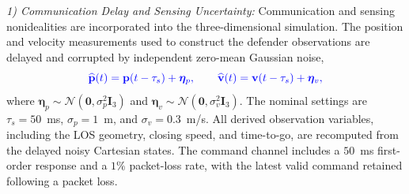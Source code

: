 \documentclass[lettersize,journal]{IEEEtran}
\newcommand{\hladd}[1]{{\color{blue}#1}}
\begin{document}



\hladd{\emph{1) Communication Delay and Sensing Uncertainty:}
Communication and sensing nonidealities are incorporated into the
three-dimensional simulation. The position and velocity measurements used to
construct the defender observations are delayed and corrupted by independent
zero-mean Gaussian noise,}
\begin{equation}
\label{eq:noise_model}
{\color{blue}
\widehat{\mathbf{p}}(t)
=
\mathbf{p}(t-\tau_s)+\boldsymbol{\eta}_p,
\qquad
\widehat{\mathbf{v}}(t)
=
\mathbf{v}(t-\tau_s)+\boldsymbol{\eta}_v,}
\end{equation}
\hladd{where
$\boldsymbol{\eta}_p\sim\mathcal{N}(\mathbf{0},\sigma_p^2\mathbf{I}_3)$
and
$\boldsymbol{\eta}_v\sim\mathcal{N}(\mathbf{0},\sigma_v^2\mathbf{I}_3)$.
The nominal settings are
$\tau_s=50$~ms,
$\sigma_p=1$~m, and
$\sigma_v=0.3$~m/s.
All derived observation variables, including the LOS geometry, closing speed,
and time-to-go, are recomputed from the delayed noisy Cartesian states.
The command channel includes a $50$~ms first-order response and a
$1\%$ packet-loss rate, with the latest valid command retained following a
packet loss.}
\end{document}
